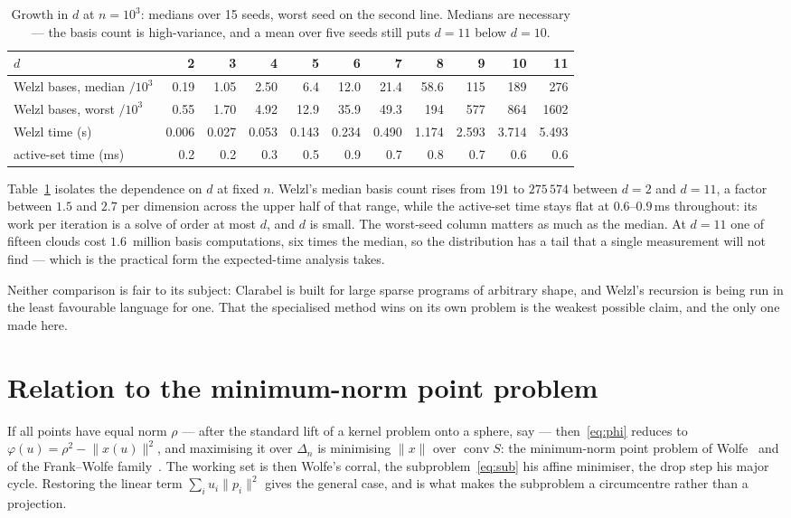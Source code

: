 \documentclass[10pt,a4paper]{article}
\theoremstyle{plain}
\theoremstyle{remark}
\DeclareMathOperator{\conv}{conv}
\newcommand{\norm}[1]{\lVert #1 \rVert}
\begin{document}
\begin{table}[h]
\centering
\small
\setlength{\tabcolsep}{4.5pt}
\begin{tabular}{l rrrrrrrrrr}
  \toprule
  $d$ & 2 & 3 & 4 & 5 & 6 & 7 & 8 & 9 & 10 & 11 \\
  \midrule
  Welzl bases, median $/10^3$ & 0.19 & 1.05 & 2.50 & 6.4 & 12.0 & 21.4 & 58.6 & 115 & 189 & 276 \\
  Welzl bases, worst $/10^3$  & 0.55 & 1.70 & 4.92 & 12.9 & 35.9 & 49.3 & 194  & 577 & 864 & 1602 \\
  Welzl time (s)              & 0.006 & 0.027 & 0.053 & 0.143 & 0.234 & 0.490 & 1.174 & 2.593 & 3.714 & 5.493 \\
  active-set time (ms)        & 0.2 & 0.2 & 0.3 & 0.5 & 0.9 & 0.7 & 0.8 & 0.7 & 0.6 & 0.6 \\
  \bottomrule
\end{tabular}
\caption{Growth in $d$ at $n=10^3$: medians over 15 seeds, worst seed on the
second line. Medians are necessary --- the basis count is high-variance, and a
mean over five seeds still puts $d=11$ below $d=10$.}
\label{tab:sweep}
\end{table}

Table~\ref{tab:sweep} isolates the dependence on $d$ at fixed $n$. Welzl's median
basis count rises from $191$ to $275\,574$ between $d=2$ and $d=11$, a factor
between $1.5$ and $2.7$ per dimension across the upper half of that range, while
the active-set time stays flat at $0.6$--$0.9$\,ms throughout: its work per
iteration is a solve of order at most $d$, and $d$ is small. The worst-seed column
matters as much as the median. At $d=11$ one of fifteen clouds cost $1.6$~million
basis computations, six times the median, so the distribution has a tail that a
single measurement will not find --- which is the practical form the
expected-time analysis takes.

Neither comparison is fair to its subject: Clarabel is built for large sparse
programs of arbitrary shape, and Welzl's recursion is being run in the least
favourable language for one. That the specialised method wins on its own problem
is the weakest possible claim, and the only one made here.

\section{Relation to the minimum-norm point problem}

If all points have equal norm $\rho$ --- after the standard lift of a kernel
problem onto a sphere, say --- then~\eqref{eq:phi} reduces to
$\varphi(u)=\rho^2-\norm{x(u)}^2$, and maximising it over $\Delta_n$ is
minimising $\norm{x}$ over $\conv S$: the minimum-norm point problem of
Wolfe~\cite{wolfe1976} and of the Frank--Wolfe family~\cite{frank1956}. The
working set is then Wolfe's corral, the subproblem~\eqref{eq:sub} his affine
minimiser, the drop step his major cycle. Restoring the linear term
$\sum_iu_i\norm{p_i}^2$ gives the general case, and is what makes the subproblem
a circumcentre rather than a projection.
\end{document}

